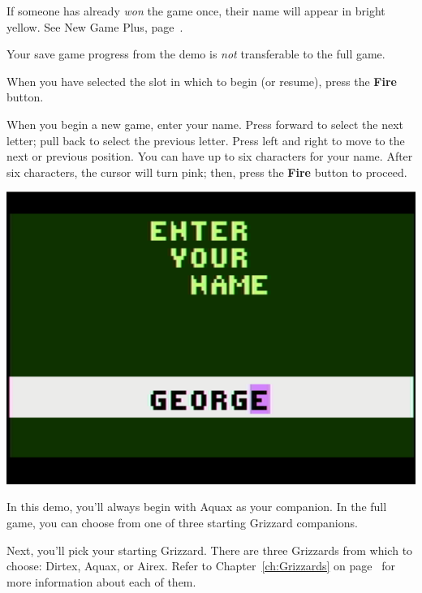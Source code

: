 \documentclass[10pt,twocolumn,openany,article]{memoir}
\begin{document}
If someone has already \emph{won} the  game once, their name will appear
in bright yellow. See New Game Plus, page~\pageref{sec:NewGamePlus}.

\ifdefined\DEMO

\skip

Your save game progress from the demo is \emph{not} transferable to the
full game.

\skip

\fi

When you have selected the slot in which to begin (or resume), press the
\textbf{Fire} button.

\fi

\ifdefined\NOSAVE\else

When you begin a new game, enter  your name. Press forward to select the
next letter;  pull back to  select the  previous letter. Press  left and
right to move to  the next or previous position. You can  have up to six
characters for  your name.  After six characters,  the cursor  will turn
pink; then, press the \textbf{Fire} button to proceed.

\begin{center}
  \includegraphics[width=\columnwidth]{../Manual/NameEntryNTSC.png}
\end{center}

\ifdefined\DEMO

In this demo,  you'll always begin with Aquax as  your companion. In the
full game, you can choose from one of three starting Grizzard companions.

\else

Next, you'll pick your starting Grizzard. There are three Grizzards from
which    to    choose:   Dirtex,    Aquax,    or    Airex.   Refer    to
Chapter~\ref{ch:Grizzards}   on  page~\pageref{ch:Grizzards}   for  more
information about each of them.
\end{document}
